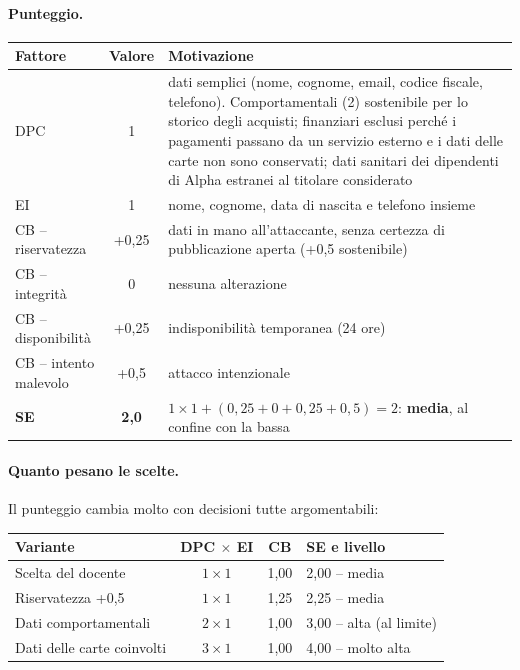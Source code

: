 \paragraph{Punteggio.}
\begin{center}
\small
\begin{tabularx}{\linewidth}{>{\raggedright\arraybackslash}p{2.6cm} c X}
\toprule
\textbf{Fattore} & \textbf{Valore} & \textbf{Motivazione}\\
\midrule
DPC & 1 & dati semplici (nome, cognome, email, codice fiscale, telefono). Comportamentali (2) sostenibile
  per lo storico degli acquisti; finanziari esclusi perché i pagamenti passano da un servizio esterno e i
  dati delle carte non sono conservati; dati sanitari dei dipendenti di Alpha estranei al titolare
  considerato\\
EI & 1 & nome, cognome, data di nascita e telefono insieme\\
CB -- riservatezza & +0,25 & dati in mano all'attaccante, senza certezza di pubblicazione aperta (+0,5
  sostenibile)\\
CB -- integrità & 0 & nessuna alterazione\\
CB -- disponibilità & +0,25 & indisponibilità temporanea (24 ore)\\
CB -- intento malevolo & +0,5 & attacco intenzionale\\
\midrule
\textbf{SE} & \textbf{2,0} & $1 \times 1 + (0{,}25 + 0 + 0{,}25 + 0{,}5) = 2$: \textbf{media}, al confine
  con la bassa\\
\bottomrule
\end{tabularx}
\end{center}

\paragraph{Quanto pesano le scelte.} Il punteggio cambia molto con decisioni tutte argomentabili:
\begin{center}
\small
\begin{tabular}{lccl}
\toprule
\textbf{Variante} & \textbf{DPC $\times$ EI} & \textbf{CB} & \textbf{SE e livello}\\
\midrule
Scelta del docente & $1 \times 1$ & 1,00 & 2,00 -- media\\
Riservatezza +0,5 & $1 \times 1$ & 1,25 & 2,25 -- media\\
Dati comportamentali & $2 \times 1$ & 1,00 & 3,00 -- alta (al limite)\\
Dati delle carte coinvolti & $3 \times 1$ & 1,00 & 4,00 -- molto alta\\
\bottomrule
\end{tabular}
\end{center}


